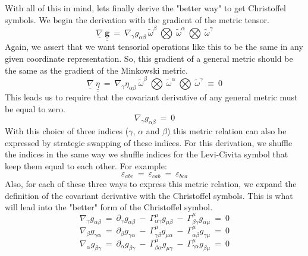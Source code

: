 \hskip 25pt With all of this in mind, lets finally derive the "better way" to get Christoffel symbols.  We begin the
derivation with the gradient of the metric tensor.
\begin{equation}
  \underline{\nabla}\ \underline{\underline{\mathbf{g}}}\ =\
  \nabla_{\gamma}g_{\alpha\beta}\ 
  \widetilde{\omega}^{\beta}\ \bigotimes\ \widetilde{\omega}^{\alpha}\ \bigotimes\ \widetilde{\omega}^{\gamma}
\end{equation}
Again, we assert that we want tensorial operations like this to be the same in any given coordinate representation.  So,
this gradient of a general metric should be the same as the gradient of the Minkowski metric.
\begin{equation}
  \underline{\nabla}\ \underline{\underline{\eta}}\ =\
  \nabla_{\gamma}\eta_{\alpha\beta}\ 
  \widetilde{\omega}^{\beta}\ \bigotimes\ \widetilde{\omega}^{\alpha}\ \bigotimes\ \widetilde{\omega}^{\gamma}\ \equiv\ 0
\end{equation}
This leads us to require that the covariant derivative of any general metric must be equal to zero.
\begin{equation}
  \nabla_{\gamma}g_{\alpha\beta}\ =\ 0
\end{equation}
With this choice of three indices ($\gamma$, $\alpha$ and $\beta$) this metric relation can also be expressed
by strategic swapping of these indices.  For this derivation, we shuffle the indices in the same way we shuffle
indices for the Levi-Civita symbol that keep them equal to each other.  For example:
$$ \varepsilon_{abc}\ =\ \varepsilon_{cab}\ =\ \varepsilon_{bca} $$
Also, for each of these three ways to express this metric relation, we expand the definition of the covariant derivative
with the Christoffel symbols.  This is what will lead into the "better" form of the Christoffel symbol.
\begin{equation}
  \nabla_{\gamma}g_{\alpha\beta}\ =\ \partial_{\gamma}g_{\alpha\beta}\ -\
  \Gamma^{\mu}_{\alpha\gamma}g_{\mu\beta}\ -\ \Gamma^{\mu}_{\beta\gamma}g_{\alpha\mu}\ =\ 0
  \label{eq:ONE}
\end{equation}
\begin{equation}
  \nabla_{\beta}g_{\gamma\alpha}\ =\ \partial_{\beta}g_{\gamma\alpha}\ -\
  \Gamma^{\mu}_{\gamma\beta}g_{\mu\alpha}\ -\ \Gamma^{\mu}_{\alpha\beta}g_{\gamma\mu}\ =\ 0
  \label{eq:TWO}
\end{equation}
\begin{equation}
  \nabla_{\alpha}g_{\beta\gamma}\ =\ \partial_{\alpha}g_{\beta\gamma}\ -\
  \Gamma^{\mu}_{\beta\alpha}g_{\mu\gamma}\ -\ \Gamma^{\mu}_{\gamma\alpha}g_{\beta\mu}\ =\ 0
  \label{eq:THREE}
\end{equation}
